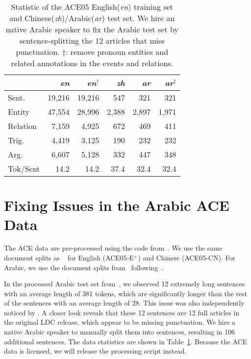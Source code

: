 \documentclass[11pt,dvipsnames]{article}
\begin{document}
\renewcommand{\arraystretch}{1.2}
\begin{table}[t!]
\centering
\small
\begin{tabular}{lrrrrr}
\toprule
 & \textit{en} & \textit{en}$^{\dagger}$ & \textit{zh} & \textit{ar} & \textit{ar}$^{\dagger}$\\
\midrule
Sent. & 19,216& 19,216 & 547 & 321 & 321\\
Entity & 47,554& 28,996 & 2,388 & 2,897 & 1,971\\
Relation & 7,159& 4,925 & 672 & 469 & 411\\
Trig. & 4,419& 3,125 & 190 & 232 & 232\\
Arg. & 6,607& 5,128 & 332 & 447 & 348\\
Tok/Sent & 14.2& 14.2 & 37.4 & 32.4 & 32.4\\
\bottomrule
\end{tabular}
\vspace{-5pt}
\caption{Statistic of the ACE05 English(\textit{en}) training set and Chinese(\textit{zh})/Arabic(\textit{ar}) test set. We hire an native Arabic  speaker to fix the Arabic test set by sentence-splitting the 12  articles that miss punctuation. 
$\dagger$: remove pronoun entities and related annotations in the events and relations.}
\vspace{-18pt}
\label{table:ace_arabic_test}
\end{table}


\section{Fixing Issues in the Arabic ACE Data}
\label{appendix:fix_issue_ace}
The  ACE data are pre-processed using the code from~\citet{lin2020oneie}. 
We use the same document splits as ~\citet{lin2020oneie} for English (ACE05-E$^{+}$) and Chinese (ACE05-CN). 
For Arabic, we use the document splits from~\citet{lan2020focused} following~\citet{wu-2021-everything}. 

In the processed Arabic test set from~\citet{wu-2021-everything}, we observed 12 extremely long sentences with an average length of 381 tokens, which are significantly longer than the rest of the sentences with an average length of 28.  This issue was also independently noticed by \citet{huang2022multilingual}.
A closer look reveals that these 12 sentences are 12 full articles in the original LDC release, which appear to be missing punctuation.
We hire a native Arabic  speaker to manually split them into sentences, resulting in 106 additional sentences. The data statistics are shown  in Table~\ref{table:ace_arabic_test}.
Because the ACE data is licensed, we will release the processing script instead.
\end{document}
